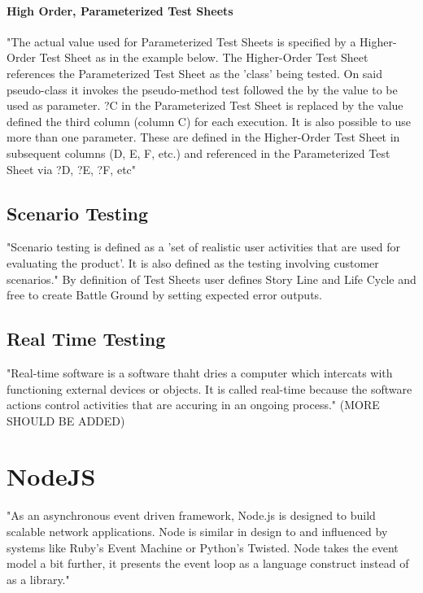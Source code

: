 \documentclass{llncs}
\begin{document}
\paragraph{High Order, Parameterized Test Sheets}
"The actual value used for Parameterized Test Sheets is specified by a Higher-Order Test Sheet as in the example below. 
The Higher-Order Test Sheet references the Parameterized Test Sheet as the 'class' being tested. 
On said pseudo-class it invokes the pseudo-method test followed the by the value to be used as parameter. 
?C in the Parameterized Test Sheet is replaced by the value defined the third column (column C) for each execution.
It is also possible to use more than one parameter. These are defined in the Higher-Order Test Sheet in subsequent columns (D, E, F, etc.) and referenced in the Parameterized Test Sheet via ?D, ?E, ?F, etc"\cite{tsh}


\subsection{Scenario Testing}
"Scenario testing is defined as a 'set of realistic user activities that are used for evaluating the product'. It is also defined as the testing involving customer scenarios."\cite{desikan}
By definition of Test Sheets user defines Story Line\cite{desikan} and Life Cycle\cite{desikan} and free to create Battle Ground\cite{desikan} by setting expected error outputs. 

\subsection{Real Time Testing}
"Real-time software is a software thaht dries a computer which intercats  with functioning external devices or objects. It is called real-time because the software actions control activities that are accuring in an ongoing process."\cite{RealTimeTesting}
(MORE SHOULD BE ADDED)



\section{NodeJS}
"As an asynchronous event driven framework, Node.js is designed to build scalable network applications. 
Node is similar in design to and influenced by systems like Ruby's Event Machine or Python's Twisted. 
Node takes the event model a bit further, it presents the event loop as a language construct instead of as a library." \cite{nodejsabout}
\end{document}
